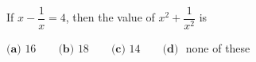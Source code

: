 If $x-\dfrac{1}{x}=4$, then the value of $x^2+\dfrac{1}{x^2}$ is

$\textbf{(a) }16\qquad\textbf{(b) }18\qquad\textbf{(c) }14\qquad\textbf{(d) }$ none of these
